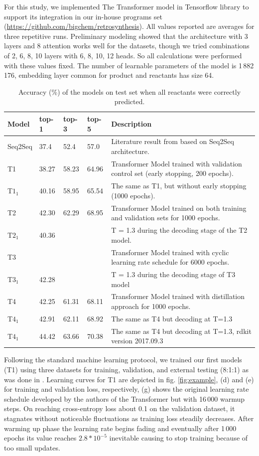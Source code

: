 \documentclass{article}
\begin{document}
For this study, we implemented The Transformer model in Tensorflow library to support its integration in our in-house programs set (\url{https://github.com/bigchem/retrosynthesis}).  All values reported are averages for three repetitive runs. Preliminary modeling showed that the architecture with 3 layers and 8 attention works well for the datasets, though we tried combinations of 2, 6, 8, 10 layers with 6, 8, 10, 12 heads. So all calculations were performed with these values fixed.  The number of learnable parameters of the model is 1\,882\,176, embedding layer common for product and reactants has size 64.
\begin{table}[b!]
  \caption{Accuracy (\%) of the models on test set when all reactants were correctly predicted.}
  \centering
  \begin{tabular}{p{2cm}p{1.5cm}p{1.5cm}p{1.5cm}p{8cm}}
    \toprule
    Model & top-1 & top-3 & top-5 & Description\\
    \midrule
    Seq2Seq & 37.4  & 52.4 & 57.0 & Literature result from \cite{Pande} based on Seq2Seq architecture. \\
    T1     & 38.27 & 58.23 & 64.96 & Transformer Model trained with validation control set (early stopping, 200 epochs). \\
    T$1_1$ & 40.16 & 58.95 & 65.54 & The same as T1, but without early stopping (1000 epochs). \\ 
    T2     & 42.30 & 62.29 & 68.95 & Transformer Model trained on both training and validation sets for 1000 epochs.\\
    T$2_1$ & 40.36 & & & T = 1.3 during the decoding stage of the T2 model. \\
    T3     &  & & & Transformer Model trained with cyclic learning rate schedule for 6000 epochs.\\
    T$3_1$ & 42.28  & & & T =  1.3 during the decoding stage of T3 model \\
    T4     &  42.25  & 61.31 & 68.11 & Transformer Model trained with distillation approach \cite{Hinton} for 1000 epochs.\\ 
    T$4_1$ & 42.91 & 62.11 & 68.92 & The same as T4 but decoding at T=1.3 \\
    T$4_1$ & 44.42 & 63.66 & 70.38 & The same as T4 but decoding at T=1.3, rdkit version 2017.09.3\\    \bottomrule
  \end{tabular}
  \label{tbl:results}
\end{table}

Following the standard machine learning protocol, we trained our first models (T1) using three datasets for training, validation, and external testing (8:1:1) as was done in \cite{Pande}. Learning curves for T1 are depicted in fig. \ref{fig:example}, (d) and (e) for training and validation loss, respectively, (g) shows the original learning rate schedule developed by the authors of the Transformer but with 16\,000 warmup steps. On reaching cross-entropy loss about 0.1 on the validation dataset, it stagnates without noticeable fluctuations as training loss steadily decreases. After warming up phase the learning rate begins fading and eventually after 1\,000 epochs its value reaches $2.8*10^{-5}$ inevitable causing to stop training because of too small updates. 
\end{document}
